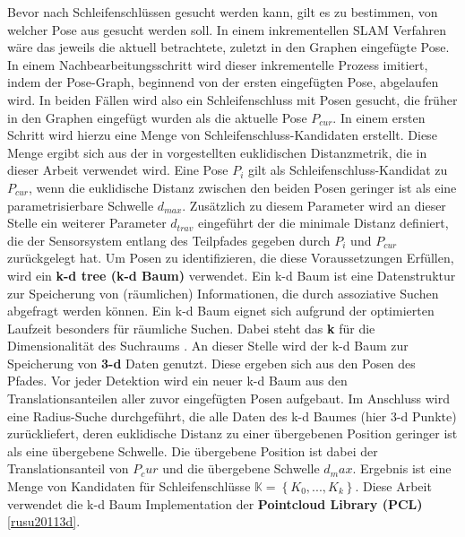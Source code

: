 Bevor nach Schleifenschlüssen gesucht werden kann, gilt es zu bestimmen, von welcher Pose aus gesucht werden soll. In einem inkrementellen SLAM Verfahren wäre das jeweils die aktuell betrachtete, zuletzt in den Graphen eingefügte Pose. In einem Nachbearbeitungsschritt wird dieser inkrementelle Prozess imitiert, indem der Pose-Graph, beginnend von der ersten eingefügten Pose, abgelaufen wird. In beiden Fällen wird also ein Schleifenschluss mit Posen gesucht, die früher in den Graphen eingefügt wurden als die aktuelle Pose $P_{cur}$. In einem ersten Schritt wird hierzu eine Menge von Schleifenschluss-Kandidaten erstellt. Diese Menge ergibt sich aus der in \cite{borrmann2008globally, shan2020lio} vorgestellten euklidischen Distanzmetrik, die in dieser Arbeit verwendet wird. Eine Pose $P_i$ gilt als Schleifenschluss-Kandidat zu $P_{cur}$, wenn die euklidische Distanz zwischen den beiden Posen geringer ist als eine parametrisierbare Schwelle $d_{max}$. Zusätzlich zu diesem Parameter wird an dieser Stelle ein weiterer Parameter $d_{trav}$ eingeführt der die minimale Distanz definiert, die der Sensorsystem entlang des Teilpfades gegeben durch $P_i$ und $P_{cur}$ zurückgelegt hat. Um Posen zu identifizieren, die diese Voraussetzungen Erfüllen, wird ein \textbf{k-d tree (k-d Baum)} \cite{bentley1975multidimensional} verwendet. Ein k-d Baum ist eine Datenstruktur zur Speicherung von (räumlichen) Informationen, die durch assoziative Suchen abgefragt werden können. Ein k-d Baum eignet sich aufgrund der optimierten Laufzeit besonders für räumliche Suchen. Dabei steht das \textbf{k} für die Dimensionalität des Suchraums \cite{bentley1975multidimensional}. An dieser Stelle wird der k-d Baum zur Speicherung von \textbf{3-d} Daten genutzt. Diese ergeben sich aus den Posen des Pfades. Vor jeder Detektion wird ein neuer k-d Baum aus den Translationsanteilen aller zuvor eingefügten Posen aufgebaut. Im Anschluss wird eine Radius-Suche durchgeführt, die alle Daten des k-d Baumes (hier 3-d Punkte) zurückliefert, deren euklidische Distanz zu einer übergebenen Position geringer ist als eine übergebene Schwelle. Die übergebene Position ist dabei der Translationsanteil von $P_cur$ und die übergebene Schwelle $d_max$. Ergebnis ist eine Menge von Kandidaten für Schleifenschlüsse $\mathbb{K} = \left\lbrace K_0, ..., K_k \right\rbrace$. Diese Arbeit verwendet die k-d Baum Implementation der \textbf{Pointcloud Library (PCL)} \ref{rusu20113d}.


